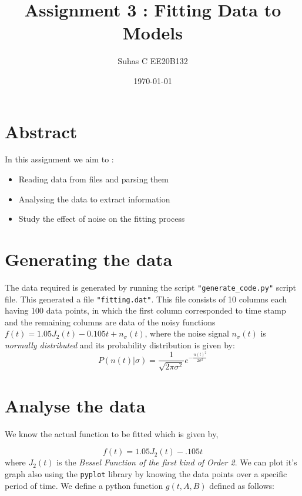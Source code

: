 \documentclass[11pt, a4paper]{article}
\title{Assignment 3 : Fitting Data to Models}
\author{Suhas C EE20B132}
\date{\today}
\begin{document}
		
		
\maketitle 
\section*{Abstract}

In this assignment we aim to :
\begin{itemize}
    \item Reading data from files and parsing them
    \item Analysing the data to extract information
    \item Study the effect of noise on the fitting process
\end{itemize}

\section{Generating the data}

 The data required is generated by running the script \texttt{"generate\_code.py"} script file. This generated a file \texttt{"fitting.dat"}. This file consists of 10 columns each having 100 data points, in which the first column corresponded to time stamp and the remaining columns are data of the noisy functions $f(t) = 1.05J_2(t)-0.105t+n_{\sigma}(t)$, where the noise signal $n_{\sigma}(t)$ is \textit{normally distributed} and its probability distribution is given by:
\begin{equation}
     P(n(t)|\sigma)=\frac{1}{\sqrt{2\pi\sigma^2}}e^{-\frac{n(t)^2}{2\sigma^2}} \label{eq:1}
\end{equation}

\section{Analyse the data}

We know the actual function to be fitted which is given by,

\begin{equation}\label{eq:2}
  f(t)=1.05J_2(t)-.105t
  \end{equation}
where $J_2(t)$ is the \textit{Bessel Function of the first kind of Order 2}. We can plot it’s graph also using the \texttt{pyplot} library by knowing the data points over a specific period of time. We define a python function $g(t, A, B)$ defined as follows:
  
\end{document}

